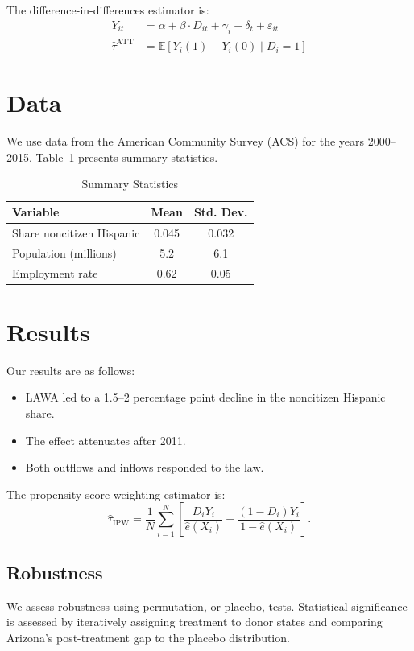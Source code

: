 \documentclass{article}
\newcommand{\E}{\mathbb{E}}
\begin{document}
The difference-in-differences estimator is:
\begin{align}
  Y_{it} &= \alpha + \beta \cdot D_{it} + \gamma_i + \delta_t + \varepsilon_{it} \\
  \hat{\tau}^{\mathrm{ATT}} &= \E\!\left[Y_i(1) - Y_i(0) \mid D_i = 1\right]
\end{align}

\section{Data}
We use data from the American Community Survey (ACS) for the years 2000--2015. Table~\ref{tab:summary} presents summary statistics.

\begin{table}[htbp]
\centering
\caption{Summary Statistics}
\label{tab:summary}
\begin{tabular}{lcc}
\hline
Variable & Mean & Std. Dev. \\
\hline
Share noncitizen Hispanic & 0.045 & 0.032 \\
Population (millions) & 5.2 & 6.1 \\
Employment rate & 0.62 & 0.05 \\
\hline
\end{tabular}
\end{table}

\section{Results}
Our results are as follows:

\begin{itemize}
  \item LAWA led to a 1.5--2 percentage point decline in the noncitizen Hispanic share.
  \item The effect attenuates after 2011.
  \item Both outflows and inflows responded to the law.
\end{itemize}

The propensity score weighting estimator is:
\[
  \hat{\tau}_{\mathrm{IPW}} = \frac{1}{N} \sum_{i=1}^{N}
  \left[
    \frac{D_i Y_i}{\hat{e}(X_i)} -
    \frac{(1 - D_i) Y_i}{1 - \hat{e}(X_i)}
  \right].
\]

\subsection{Robustness}
We assess robustness using permutation, or placebo, tests. Statistical significance is assessed by iteratively assigning treatment to donor states and comparing Arizona's post-treatment gap to the placebo distribution.
\end{document}

